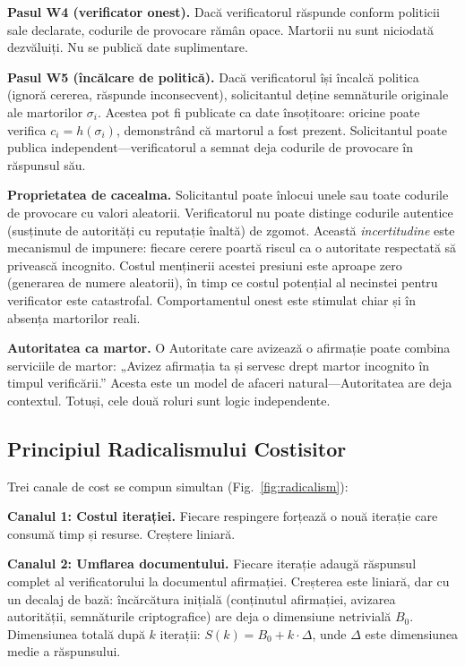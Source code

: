 \documentclass[11pt,a4paper,twocolumn]{article}
\begin{document}
\textbf{Pasul W4 (verificator onest).} Dacă verificatorul răspunde conform politicii sale declarate, codurile de provocare rămân opace. Martorii nu sunt niciodată dezvăluiți. Nu se publică date suplimentare.

\textbf{Pasul W5 (încălcare de politică).} Dacă verificatorul își încalcă politica (ignoră cererea, răspunde inconsecvent), solicitantul deține semnăturile originale ale martorilor $\sigma_i$. Acestea pot fi publicate ca date însoțitoare: oricine poate verifica $c_i = h(\sigma_i)$, demonstrând că martorul a fost prezent. Solicitantul poate publica independent---verificatorul a semnat deja codurile de provocare în răspunsul său.

\textbf{Proprietatea de cacealma.} Solicitantul poate înlocui unele sau toate codurile de provocare cu valori aleatorii. Verificatorul nu poate distinge codurile autentice (susținute de autorități cu reputație înaltă) de zgomot. Această \emph{incertitudine} este mecanismul de impunere: fiecare cerere poartă riscul ca o autoritate respectată să privească incognito. Costul menținerii acestei presiuni este aproape zero (generarea de numere aleatorii), în timp ce costul potențial al necinstei pentru verificator este catastrofal. Comportamentul onest este stimulat chiar și în absența martorilor reali.

\textbf{Autoritatea ca martor.} O Autoritate care avizează o afirmație poate combina serviciile de martor: „Avizez afirmația ta și servesc drept martor incognito în timpul verificării.” Acesta este un model de afaceri natural---Autoritatea are deja contextul. Totuși, cele două roluri sunt logic independente.

\subsection{Principiul Radicalismului Costisitor}

Trei canale de cost se compun simultan (Fig.~\ref{fig:radicalism}):

\textbf{Canalul 1: Costul iterației.} Fiecare respingere forțează o nouă iterație care consumă timp și resurse. Creștere liniară.

\textbf{Canalul 2: Umflarea documentului.} Fiecare iterație adaugă răspunsul complet al verificatorului la documentul afirmației. Creșterea este liniară, dar cu un decalaj de bază: încărcătura inițială (conținutul afirmației, avizarea autorității, semnăturile criptografice) are deja o dimensiune netrivială $B_0$. Dimensiunea totală după $k$ iterații: $S(k) = B_0 + k \cdot \Delta$, unde $\Delta$ este dimensiunea medie a răspunsului.
\end{document}
